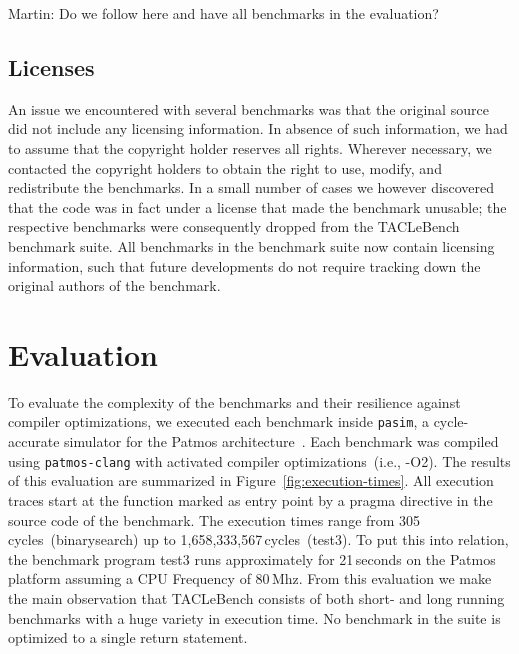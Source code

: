 \documentclass[a4paper,UKenglish]{oasics}
\newcommand{\martin}[1]{{\color{blue} Martin: #1}}
\begin{document}
\martin{Do we follow here and have all benchmarks in the evaluation?}


\subsection{Licenses}

An issue we encountered with several benchmarks was that the original
source did not include any licensing information. In absence of such
information, we had to assume that the copyright holder reserves all
rights. Wherever necessary, we contacted the copyright holders to
obtain the right to use, modify, and redistribute the benchmarks. In a
small number of cases we however discovered that the code was in fact
under a license that made the benchmark unusable; the respective
benchmarks were consequently dropped from the TACLeBench benchmark
suite. All benchmarks in the benchmark suite now contain licensing
information, such that future developments do not require tracking
down the original authors of the benchmark.



\section{Evaluation}
\label{sec:eval}
To evaluate the complexity of the benchmarks and their resilience against 
compiler optimizations, we executed each benchmark inside \texttt{pasim}, a 
cycle-accurate simulator for the Patmos architecture~\cite{t-crest:2015}. Each 
benchmark was compiled using \texttt{patmos-clang} with activated compiler 
optimizations~(i.e., -O2). The results of this evaluation are summarized in 
Figure~\ref{fig:execution-times}. All execution traces start at the function 
marked as entry point by a pragma directive in the source code of the benchmark.
The execution times range from 305\,cycles~(binarysearch) up to 
1,658,333,567\,cycles~(test3).
To put this into relation, the benchmark program test3 runs approximately 
for 21\,seconds on the Patmos platform assuming a CPU Frequency of 80\,Mhz.
From this evaluation we make the main observation that 
TACLeBench consists of both short- and long running benchmarks with a huge variety in execution time. 
No benchmark in the suite is optimized to a single return statement.
\end{document}

